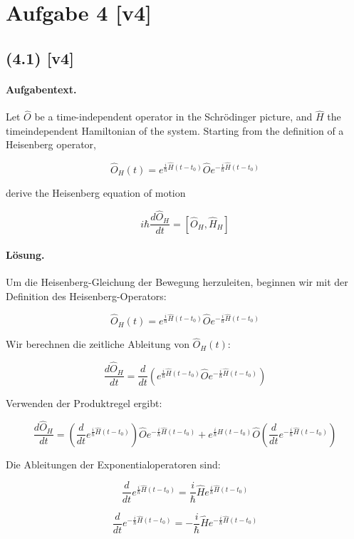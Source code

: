 \documentclass[11pt,a4paper]{article}
\begin{document}
\section*{Aufgabe 4 [v4]}
\subsection*{(4.1) [v4]}
\paragraph{Aufgabentext.}
Let $\hat{O}$ be a time-independent operator in the Schrödinger picture, and $\hat{H}$ the timeindependent Hamiltonian of the system. Starting from the definition of a Heisenberg operator,

$$
\hat{O}_H(t)=e^{\frac{i}{\hbar} \hat{H}\left(t-t_0\right)} \hat{O} e^{-\frac{i}{\hbar} \hat{H}\left(t-t_0\right)}
$$

derive the Heisenberg equation of motion

$$
i \hbar \frac{d \hat{O}_H}{d t}=\left[\hat{O}_H, \hat{H}_H\right]
$$

\paragraph{Lösung.}
Um die Heisenberg-Gleichung der Bewegung herzuleiten, beginnen wir mit der Definition des Heisenberg-Operators:

\[
\hat{O}_H(t) = e^{\frac{i}{\hbar} \hat{H}(t-t_0)} \hat{O} e^{-\frac{i}{\hbar} \hat{H}(t-t_0)}
\]

Wir berechnen die zeitliche Ableitung von \(\hat{O}_H(t)\):

\[
\frac{d \hat{O}_H}{d t} = \frac{d}{d t} \left( e^{\frac{i}{\hbar} \hat{H}(t-t_0)} \hat{O} e^{-\frac{i}{\hbar} \hat{H}(t-t_0)} \right)
\]

Verwenden der Produktregel ergibt:

\[
\frac{d \hat{O}_H}{d t} = \left( \frac{d}{d t} e^{\frac{i}{\hbar} \hat{H}(t-t_0)} \right) \hat{O} e^{-\frac{i}{\hbar} \hat{H}(t-t_0)} + e^{\frac{i}{\hbar} \hat{H}(t-t_0)} \hat{O} \left( \frac{d}{d t} e^{-\frac{i}{\hbar} \hat{H}(t-t_0)} \right)
\]

Die Ableitungen der Exponentialoperatoren sind:

\[
\frac{d}{d t} e^{\frac{i}{\hbar} \hat{H}(t-t_0)} = \frac{i}{\hbar} \hat{H} e^{\frac{i}{\hbar} \hat{H}(t-t_0)}
\]

\[
\frac{d}{d t} e^{-\frac{i}{\hbar} \hat{H}(t-t_0)} = -\frac{i}{\hbar} \hat{H} e^{-\frac{i}{\hbar} \hat{H}(t-t_0)}
\]
\end{document}
